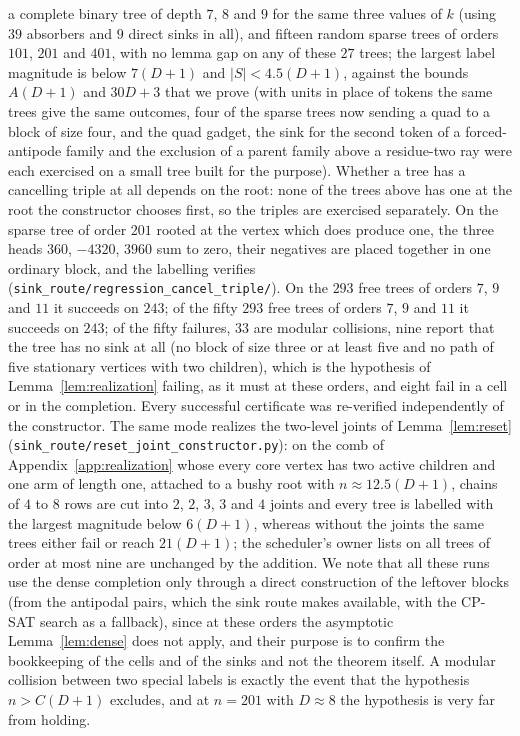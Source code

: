 \documentclass[11pt,a4paper]{article}
\theoremstyle{plain}
\theoremstyle{definition}
\theoremstyle{remark}
\newcommand{\file}[1]{\texttt{#1}}
\begin{document}
a complete binary tree of depth $7$, $8$ and $9$ for the same three values of
$k$ (using $39$ absorbers and $9$ direct sinks in all), and fifteen random
sparse trees of orders $101$, $201$ and $401$, with no lemma gap on any of
these $27$ trees; the largest label magnitude is below $7(D+1)$ and
$|S|<4.5(D+1)$, against the bounds $A(D+1)$ and $30D+3$ that we prove (with
units in place of tokens the same trees give the same outcomes, four of the
sparse trees now sending a quad to a block of size four, and the quad gadget,
the sink for the second token of a forced-antipode family and the exclusion
of a parent family above a residue-two ray were each exercised on a small tree
built for the purpose).  Whether a tree has a cancelling triple at all depends
on the root: none of the trees above has one at the root the constructor
chooses first, so the triples are exercised separately.  On the sparse tree of
order $201$ rooted at the vertex which does produce one, the three heads
$360$, $-4320$, $3960$ sum to zero, their negatives are placed together in one
ordinary block, and the labelling verifies
(\file{sink\_route/regression\_cancel\_triple/}).  On the
$293$ free trees of orders $7$, $9$ and $11$ it succeeds on $243$; of the fifty
$293$ free trees of orders $7$, $9$ and $11$ it succeeds on $243$; of the fifty
failures, $33$ are modular collisions, nine report that the tree has no sink at
all (no block of size three or at least five and no path of five stationary
vertices with two children), which is the hypothesis of
Lemma~\ref{lem:realization} failing, as it must at these orders, and eight fail
in a cell or in the completion.  Every successful certificate was re-verified
independently of the constructor.  The same mode realizes the two-level joints
of Lemma~\ref{lem:reset} (\file{sink\_route/reset\_joint\_constructor.py}): on
the comb of Appendix~\ref{app:realization} whose every core vertex has two
active children and one arm of length one, attached to a bushy root with
$n\approx 12.5(D+1)$, chains of $4$ to $8$ rows are cut into $2$, $2$, $3$,
$3$ and $4$ joints and every tree is labelled with the largest magnitude below
$6(D+1)$, whereas without the joints the same trees either fail or reach
$21(D+1)$; the scheduler's owner lists on all trees of order at most nine are
unchanged by the addition.  We note that all these runs use the dense
completion only through a direct construction of the leftover blocks (from the
antipodal pairs, which the sink route makes available, with the CP-SAT search
as a fallback), since at these orders the asymptotic Lemma~\ref{lem:dense}
does not apply, and their purpose is to confirm the bookkeeping of the cells
and of the sinks and not the theorem itself.  A modular collision between two
special labels is exactly the event that the hypothesis $n>C(D+1)$ excludes,
and at $n=201$ with $D\approx 8$ the hypothesis is very far from holding.
\end{document}
